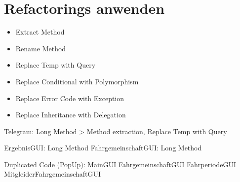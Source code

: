 \section{Refactorings anwenden}
\begin{itemize}
    \item Extract Method
    \item Rename Method
    \item Replace Temp with Query
    \item Replace Conditional with Polymorphism
    \item Replace Error Code with Exception
    \item Replace Inheritance with Delegation
\end{itemize}


Telegram: Long Method > Method extraction, Replace Temp with Query

ErgebnisGUI: Long Method
FahrgemeinschaftGUI: Long Method

Duplicated Code (PopUp):
MainGUI
FahrgemeinschaftGUI
FahrperiodeGUI
MitgleiderFahrgemeinschaftGUI
